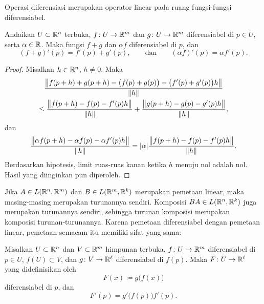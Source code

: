 Operasi diferensiasi merupakan operator linear pada ruang fungsi-fungsi
diferensiabel.

\begin{prop}
Andaikan $U \subset {\mathbb{R}}^n$ terbuka,
$f \colon U \to {\mathbb{R}}^m$ dan
$g \colon U \to {\mathbb{R}}^m$ diferensiabel di $p \in U$,
serta $\alpha \in {\mathbb{R}}$.  Maka fungsi $f+g$ dan $\alpha f$
diferensiabel di $p$, dan
\begin{equation*}
(f+g)'(p) = f'(p) + g'(p) , \qquad \text{dan} \qquad (\alpha f)'(p) = \alpha
f'(p) .
\end{equation*}
\end{prop}

\begin{proof}
Misalkan $h \in {\mathbb{R}}^n$, $h \neq 0$.  Maka
\begin{multline*}
\frac{\bigl\lVert {f(p+h)+g(p+h)-\bigl(f(p)+g(p)\bigr) - \bigl(f'(p) + g'(p)\bigr)h} \bigr\rVert}{\lVert {h} \rVert}
\\
\leq
\frac{\bigl\lVert {f(p+h)-f(p) - f'(p)h} \bigr\rVert}{\lVert {h} \rVert}
+
\frac{\bigl\lVert {g(p+h)-g(p) - g'(p)h} \bigr\rVert}{\lVert {h} \rVert} ,
\end{multline*}
dan
\begin{equation*}
\frac{\bigl\lVert {\alpha f(p+h) - \alpha f(p) - \alpha f'(p)h} \bigr\rVert}{\lVert {h} \rVert}
=
\lvert {\alpha} \rvert \frac{\bigl\lVert {f(p+h)-f(p) - f'(p)h} \bigr\rVert}{\lVert {h} \rVert} .
\end{equation*}
Berdasarkan hipotesis, limit ruas-ruas kanan ketika $h$ menuju nol adalah nol.
Hasil yang diinginkan pun diperoleh.
\end{proof}

Jika $A \in L({\mathbb{R}}^n,{\mathbb{R}}^m)$ dan $B \in L({\mathbb{R}}^m,{\mathbb{R}}^k)$ merupakan pemetaan linear, maka
masing-masing merupakan turunannya sendiri.  Komposisi
$BA \in L({\mathbb{R}}^n,{\mathbb{R}}^k)$ juga merupakan turunannya sendiri, sehingga
turunan komposisi merupakan komposisi
turunan-turunannya.  Karena pemetaan diferensiabel
dengan pemetaan linear, pemetaan semacam itu memiliki sifat yang sama:

\begin{thm} 
Misalkan $U \subset {\mathbb{R}}^n$ dan $V \subset {\mathbb{R}}^m$ himpunan terbuka, $f \colon U \to
{\mathbb{R}}^m$ diferensiabel di $p \in U$, $f(U) \subset V$,
dan $g \colon V \to {\mathbb{R}}^\ell$ diferensiabel
di $f(p)$.  Maka $F \colon U \to {\mathbb{R}}^{\ell}$ yang didefinisikan oleh
\begin{equation*}
F(x) \coloneqq g\bigl(f(x)\bigr)
\end{equation*}
diferensiabel di $p$, dan
\begin{equation*}
F'(p) = g'\bigl(f(p)\bigr) f'(p) .
\end{equation*}
\end{thm}

